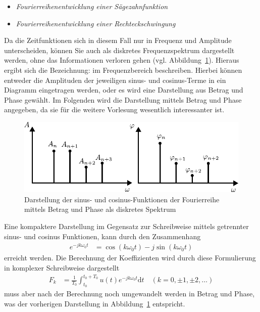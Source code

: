%
\begin{simulation}{}{}
	\begin{itemize}
		\item \textit{Fourierreihenentwicklung einer Sägezahnfunktion}
		\item \textit{Fourierreihenentwicklung einer Rechteckschwingung}
	\end{itemize}
\end{simulation}
%
Da die Zeitfunktionen sich in diesem Fall nur in Frequenz und Amplitude unterscheiden, können Sie auch als diskretes Frequenzspektrum dargestellt werden, ohne das Informationen verloren gehen (vgl. Abbildung~\ref{fig:spektrumdiskret}). Hieraus ergibt sich die Bezeichnung: \glqq{}im Frequenzbereich beschreiben\grqq{}. Hierbei können entweder die Amplituden der jeweiligen sinus- und cosinus-Terme in ein Diagramm eingetragen werden, oder es wird eine Darstellung aus Betrag und Phase gewählt. Im Folgenden wird die Darstellung mittels Betrag und Phase angegeben, da sie für die weitere Vorlesung wesentlich interessanter ist.
%
\begin{figure}[h]
	\centering
	\includegraphics[width=0.75\linewidth]{Abbildungen/Modellbildung/PDF/DiskretesSpektrum.pdf}
	\caption{Darstellung der sinus- und cosinus-Funktionen der Fourierreihe mittels Betrag und Phase als diskretes Spektrum}
	\label{fig:spektrumdiskret}
\end{figure}
%
Eine kompaktere Darstellung im Gegensatz zur Schreibweise mittels getrennter sinus- und cosinus Funktionen, kann durch den Zusammenhang 
%
\begin{equation*}
\begin{aligned}
e^{-jk\omega_{0}t}&=\cos(k\omega_{0}t)-j\sin(k\omega_{0}t)
\end{aligned}
\end{equation*} 
%
erreicht werden. Die Berechnung der Koeffizienten wird durch diese Formulierung in komplexer Schreibweise dargestellt
%
\begin{equation*}
\begin{aligned}
F_{k}&=\frac{1}{T_{0}}\int_{t_{0}}^{t_{0}+T_{0}}u(t)e^{-jk\omega_{0}t}\text{d}t \quad (k=0,\pm 1,\pm 2,\ldots)
\end{aligned}
\end{equation*} 
%
muss aber nach der Berechnung noch umgewandelt werden in Betrag und Phase, was der vorherigen Darstellung in Abbildung~\ref{fig:spektrumdiskret} entspricht. 
%
